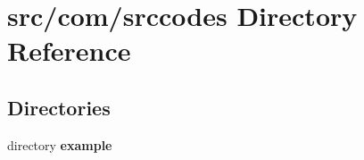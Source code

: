 \section{src/com/srccodes Directory Reference}
\label{dir_1537f94eba15e9eddbd9d013b1d5e1d5}
\subsection*{Directories}
\begin{DoxyCompactItemize}
\item 
directory {\bf example}
\end{DoxyCompactItemize}
